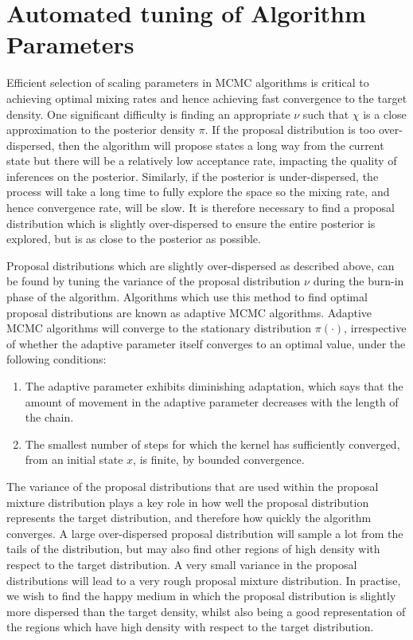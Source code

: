 \documentclass[final]{siamltex}
\begin{document}
\section{Automated tuning of Algorithm Parameters}\label{Sec:adapt}

Efficient selection of scaling parameters in MCMC algorithms is critical to achieving optimal mixing rates and hence achieving fast convergence to the target density. One significant difficulty is finding an appropriate $\nu$ such that
$\chi$ is a close approximation to the posterior density $\pi$. If the proposal distribution is too over-dispersed, then the algorithm will propose states a long way from the current state but there will be a relatively low acceptance rate, impacting the quality of inferences on the posterior. Similarly, if the posterior is under-dispersed, the process will take a long time to fully explore the space so the mixing rate, and hence convergence rate, will be slow. It is therefore necessary to find a proposal distribution which is slightly over-dispersed to ensure the entire posterior is explored\cite{gelman1992inference}, but is as close to the posterior as possible.

Proposal distributions which are slightly over-dispersed as described
above, can be found by tuning the variance of the proposal
distribution $\nu$ during the burn-in phase of the
algorithm. Algorithms which use this method to find optimal proposal
distributions are known as adaptive MCMC algorithms. Adaptive MCMC
algorithms will converge to the stationary distribution $\pi(\cdot)$,
irrespective of whether the adaptive parameter itself converges to an
optimal value, under the following
conditions\cite{roberts2007coupling,roberts2009examples}: 
\begin{enumerate}
\item The adaptive parameter exhibits diminishing adaptation, which says that the amount of movement in the adaptive parameter decreases with the length of the chain. 
\item The smallest number of steps for which the kernel has sufficiently converged, from an initial state $x$, is finite, by bounded convergence.
\end{enumerate}

The variance of the proposal distributions that are used within the
proposal mixture distribution plays a key role in how well the
proposal distribution represents the target distribution, and
therefore how quickly the algorithm converges. A large over-dispersed
proposal distribution will sample a lot from the tails of the
distribution, but may also find other regions of high density with
respect to the target distribution. A very small variance in the
proposal distributions will lead to a very rough proposal mixture
distribution. In practise, we wish to find the happy medium in which
the proposal distribution is slightly more dispersed than the target
density, whilst also being a good representation of the regions which
have high density with respect to the target distribution.
\end{document}
